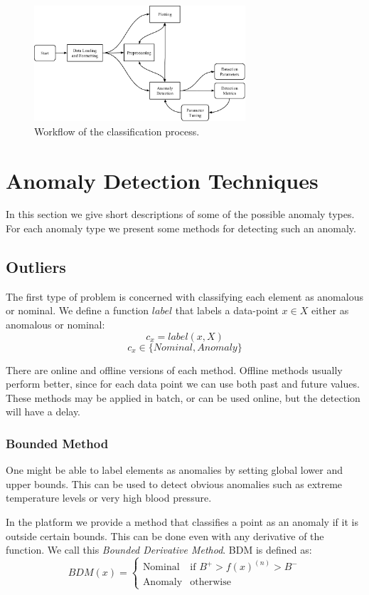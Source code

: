 \documentclass[a4paper, 10pt]{article}
\begin{document}
\begin{figure}
\centering
\includegraphics[width=0.7\textwidth]{Workflow}
\caption{Workflow of the classification process.}
\label{fig:workflow}
\end{figure}

\FloatBarrier

\section{Anomaly Detection Techniques \label{methods}}

In this section we give short descriptions of some of the possible anomaly types. For each anomaly type we present some methods for detecting such an anomaly.

\subsection{Outliers}

The first type of problem is concerned with classifying each element as anomalous or nominal. We define a function $label$ that labels a data-point $x \in X$ either as anomalous or nominal:
$$c_x = label(x,X)$$
$$c_x \in \{Nominal, Anomaly\}$$

There are online and offline versions of each method. Offline methods usually perform better, since for each data point we can use both past and future values. These methods may be applied in batch, or can be used online, but the detection will have a delay.

\subsubsection{Bounded Method}

One might be able to label elements as anomalies by setting global lower and upper bounds. This can be used to detect obvious anomalies such as extreme temperature levels or very high blood pressure. 

In the platform we provide a method that classifies a point as an anomaly if it is outside certain bounds. This can be done even with any derivative of the function. We call this \emph{Bounded Derivative Method}. BDM is defined as:
$$
	BDM(x) = 
	\begin{cases}
       \text{Nominal} & \text{if } B^+ > f(x)^{(n)} > B^-\\
    	\text{Anomaly} & \text{otherwise}
    \end{cases}
$$
\end{document}
